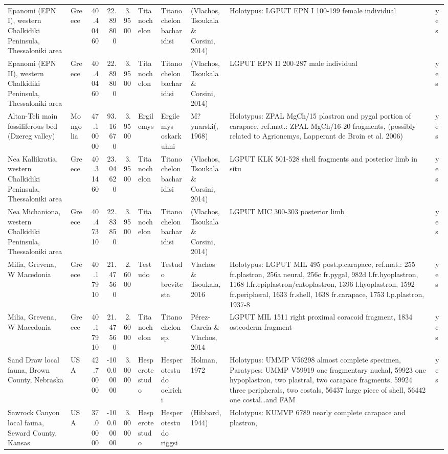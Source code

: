 \documentclass[]{article}
\begin{document}
\begin{longtable}[]{@{}llrrrlllll@{}}
Epanomi (EPN I), western Chalkidiki Peninsula, Thessaloniki area &
Greece & 40.40460 & 22.89800 & 3.9500 & Titanochelon & Titanochelon
bacharidisi & (Vlachos, Tsoukala \& Corsini, 2014) & Holotypus: LGPUT
EPN I 100-199 female individual & yes\tabularnewline
Epanomi (EPN II), western Chalkidiki Peninsula, Thessaloniki area &
Greece & 40.40460 & 22.89800 & 3.9500 & Titanochelon & Titanochelon
bacharidisi & (Vlachos, Tsoukala \& Corsini, 2014) & LGPUT EPN II
200-287 male individual & yes\tabularnewline
Altan-Teli main fossiliferous bed (Dzereg valley) & Mongolia & 47.10000
& 93.16670 & 3.9500 & Ergilemys & Ergilemys oskarkuhni & M?ynarski(,
1968) & Holotypus: ZPAL MgCh/15 plastron and pygal portion of carapace,
ref.mat.: ZPAL MgCh/16-20 fragments, (possibly related to Agrionemys,
Lapperant de Broin et al. 2006) & yes\tabularnewline
Nea Kallikratia, western Chalkidiki Peninsula, Thessaloniki area &
Greece & 40.31460 & 23.04620 & 3.9500 & Titanochelon & Titanochelon
bacharidisi & (Vlachos, Tsoukala \& Corsini, 2014) & LGPUT KLK 501-528
shell fragments and posterior limb in situ & yes\tabularnewline
Nea Michaniona, western Chalkidiki Peninsula, Thessaloniki area & Greece
& 40.47310 & 22.83850 & 3.9500 & Titanochelon & Titanochelon bacharidisi
& (Vlachos, Tsoukala \& Corsini, 2014) & LGPUT MIC 300-303 posterior
limb & yes\tabularnewline
Milia, Grevena, W Macedonia & Greece & 40.17910 & 21.47560 & 2.6000 &
Testudo & Testudo brevitesta & Vlachos \& Tsoukala, 2016 & Holotypus:
LGPUT MIL 495 post.p.carapace, ref.mat.: 255 fr.plastron, 256a neural,
256c fr.pygal, 982d l.fr.hyoplastron, 1168
l.fr.epiplastron/entoplastron, 1396 l.hyoplastron, 1592 fr.peripheral,
1633 fr.shell, 1638 fr.carapace, 1753 l.p.plastron, 1937-8 &
yes\tabularnewline
Milia, Grevena, W Macedonia & Greece & 40.17910 & 21.47560 & 2.6000 &
Titanochelon & Titanochelon sp. & Pérez-Garcia \& Vlachos, 2014 & LGPUT
MIL 1511 right proximal coracoid fragment, 1834 osteoderm fragment &
yes\tabularnewline
Sand Draw local fauna, Brown County, Nebraska & USA & 42.70000 &
-100.00000 & 3.0000 & Hesperotestudo & Hesperotestudo oelrichi & Holman,
1972 & Holotypus: UMMP V56298 almost complete specimen, Paratypes: UMMP
V59919 one fragmentary nuchal, 59923 one hypoplastron, two plastral, two
carapace fragments, 59924 three peripherals, two costals, 56437 large
piece of shell, 56442 one costal\ldots{}and FAM & yes\tabularnewline
Sawrock Canyon local fauna, Seward County, Kansas & USA & 37.00000 &
-100.00000 & 3.0000 & Hesperotestudo & Hesperotestudo riggsi & (Hibbard,
1944) & Holotypus: KUMVP 6789 nearly complete carapace and plastron,

\end{longtable}
\end{document}
